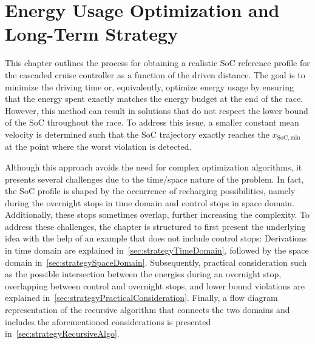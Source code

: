 
\chapter{Energy Usage Optimization and Long-Term Strategy}
\label{chp:strategy}
This chapter outlines the process for obtaining a realistic SoC reference profile for the cascaded cruise controller as a function of the driven distance. The goal is to minimize the driving time or, equivalently, optimize energy usage by ensuring that the energy spent exactly matches the energy budget at the end of the race. However, this method can result in solutions that do not respect the lower bound of the SoC throughout the race. To address this issue, a smaller constant mean velocity is determined such that the SoC trajectory exactly reaches the $x_\mathrm{SoC,min}$ at the point where the worst violation is detected.

Although this approach avoids the need for complex optimization algorithms, it presents several challenges due to the time/space nature of the problem. In fact, the SoC profile is shaped by the occurrence of recharging possibilities, namely during the overnight stops in time domain and control stops in space domain. Additionally, these stops sometimes overlap, further increasing the complexity. To address these challenges, the chapter is structured to first present the underlying idea with the help of an example that does not include control stops: Derivations in time domain are explained in~\cref{sec:strategyTimeDomain}, followed by the space domain in~\cref{sec:strategySpaceDomain}. Subsequently, practical consideration such as the possible intersection between the energies during an overnight stop, overlapping between control and overnight stops, and lower bound violations are explained in~\cref{sec:strategyPracticalConsideration}. Finally, a flow diagram representation of the recursive algorithm that connects the two domains and includes the aforementioned considerations is presented in~\cref{sec:strategyRecursiveAlgo}.
 


